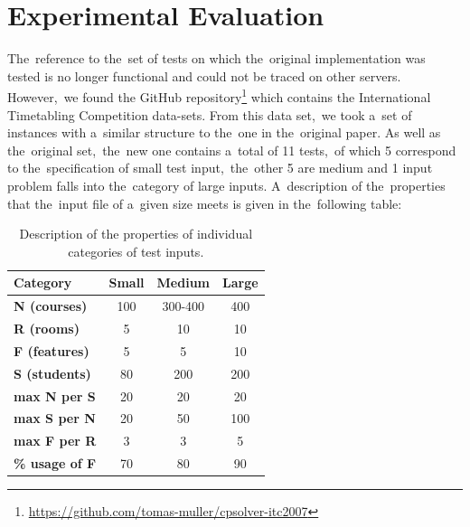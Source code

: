 \section{Experimental Evaluation} \label{sec:experiments}
The~reference to the~set of tests on which the~original implementation was tested is no longer functional and could not be traced on other servers.
However,~we found the GitHub repository\footnote{\url{https://github.com/tomas-muller/cpsolver-itc2007}} which contains the International Timetabling Competition data-sets.
From this data set,~we took a~set of instances with a~similar structure to the~one in the~original paper.
As well as the~original set,~the~new one contains a~total of 11 tests,~of which 5 correspond to the~specification of small test input,~the~other 5 are medium and 1 input problem falls into the~category of large inputs.
A~description of the~properties that the~input file of a~given size meets is given in the~following table:
\begin{table}[ht!]
\centering
\begin{tabular}{|l|c|c|c|}
\hline
\textbf{Category} & \multicolumn{1}{l|}{\textbf{Small}} & \multicolumn{1}{l|}{\textbf{Medium}} & \multicolumn{1}{l|}{\textbf{Large}} \\ \hline
\textbf{N (courses)}        & 100                                 & 300-400                              & 400                                 \\ \hline
\textbf{R (rooms)}        & 5                                   & 10                                   & 10                                  \\ \hline
\textbf{F (features)}        & 5                                   & 5                                    & 10                                  \\ \hline
\textbf{S (students)}        & 80                                  & 200                                  & 200                                 \\ \hline
\textbf{max N per S}  & 20                                  & 20                                   & 20                                  \\ \hline
\textbf{max S per N}  & 20                                  & 50                                   & 100                                 \\ \hline
\textbf{max F per R}  & 3                                   & 3                                    & 5                                   \\ \hline
\textbf{\% usage of F}     & 70                                  & 80                                   & 90                                  \\ \hline
\end{tabular}
\caption{Description of the properties of individual categories of test inputs.}
\end{table}

